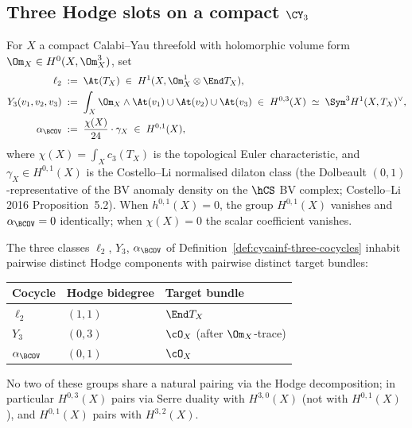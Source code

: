 \subsection{Three Hodge slots on a compact \texorpdfstring{$\CY_3$}{CY3}}
\label{subsec:cycainf-three-hodge-slots}

\begin{definition}
\label{def:cycainf-three-cocycles}
For $X$ a compact Calabi--Yau threefold with holomorphic volume form
$\Om_X \in H^0(X, \Om^3_X)$, set
\begin{align*}
 \ell_2 &\;:=\; \At(T_X) \;\in\; H^1(X, \Om^1_X \otimes \End T_X),\\
 Y_3(v_1, v_2, v_3) &\;:=\; \int_X \Om_X \wedge \At(v_1) \cup \At(v_2)
 \cup \At(v_3) \;\in\; H^{0,3}(X) \;\simeq\; \Sym^3 H^1(X, T_X)^\vee,\\
 \alpha_{\BCOV} &\;:=\; \frac{\chi(X)}{24} \cdot \gamma_X
 \;\in\; H^{0,1}(X),
\end{align*}
where $\chi(X) = \int_X c_3(T_X)$ is the topological Euler
characteristic, and $\gamma_X \in H^{0,1}(X)$ is the Costello--Li
normalised dilaton class (the Dolbeault $(0,1)$-representative of the
BV anomaly density on the $\hCS$ BV complex; Costello--Li 2016
Proposition~5.2). When $h^{0,1}(X) = 0$, the group $H^{0,1}(X)$ vanishes
and $\alpha_{\BCOV} = 0$ identically; when $\chi(X) = 0$ the scalar
coefficient vanishes.
\end{definition}

\begin{proposition}
\label{prop:cycainf-hodge-disjoint}
The three classes $\ell_2$, $Y_3$, $\alpha_{\BCOV}$ of
Definition~\ref{def:cycainf-three-cocycles} inhabit pairwise distinct
Hodge components with pairwise distinct target bundles:
\begin{center}
\begin{tabular}{lll}
Cocycle & Hodge bidegree & Target bundle\\ \hline
$\ell_2$ & $(1,1)$ & $\End T_X$\\
$Y_3$ & $(0,3)$ & $\cO_X$ (after $\Om_X$-trace)\\
$\alpha_{\BCOV}$ & $(0,1)$ & $\cO_X$
\end{tabular}
\end{center}
No two of these groups share a natural pairing via the Hodge decomposition;
in particular $H^{0,3}(X)$ pairs via Serre duality with $H^{3,0}(X)$
(not with $H^{0,1}(X)$), and $H^{0,1}(X)$ pairs with $H^{3,2}(X)$.
\end{proposition}

